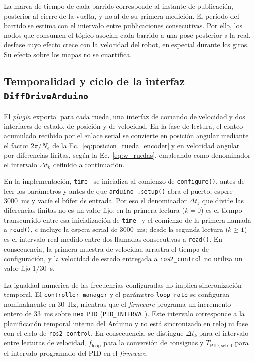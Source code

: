\begin{appendices}
La marca de tiempo de cada barrido corresponde al instante de publicación,
posterior al cierre de la vuelta, y no al de su primera medición. El período
del barrido se estima con el intervalo entre publicaciones consecutivas. Por
ello, los nodos que consumen el tópico asocian cada barrido a una pose
posterior a la real, desfase cuyo efecto crece con la velocidad del robot, en
especial durante los giros. Su efecto sobre los mapas no se cuantifica.

\subsection{Temporalidad y ciclo de la interfaz \texttt{DiffDriveArduino}}
\label{anx:implementacion_diffdrive}

\noindent El \textit{plugin} exporta, para cada rueda, una interfaz de comando de
velocidad y dos interfaces de estado, de posición y de velocidad. En la fase
de lectura, el conteo acumulado recibido por el enlace serial se convierte en
posición angular mediante el factor $2\pi/N_e$ de la
Ec.~\eqref{eq:posicion_rueda_encoder} y en velocidad angular por diferencias
finitas, según la Ec.~\eqref{eq:w_ruedas}, empleando como denominador el
intervalo $\Delta t_k$ definido a continuación.

\noindent En la implementación, \texttt{time\_} se inicializa al comienzo de \texttt{configure()}, antes de leer los parámetros y antes de que \texttt{arduino\_.setup()} abra el puerto, espere 3000~ms y vacíe el búfer de entrada. Por eso el denominador $\Delta t_k$ que divide las diferencias finitas no es un valor fijo: en la primera lectura ($k=0$) es el tiempo transcurrido entre esa inicialización de \texttt{time\_} y el comienzo de la primera llamada a \texttt{read()}, e incluye la espera serial de 3000~ms; desde la segunda lectura ($k\geq1$) es el intervalo real medido entre dos llamadas consecutivas a \texttt{read()}. En consecuencia, la primera muestra de velocidad arrastra el tiempo de configuración, y la velocidad de estado entregada a \texttt{ros2\_control} no utiliza un valor fijo $1/30$~s.

La igualdad numérica de las frecuencias configuradas no implica sincronización temporal. El \texttt{controller\_manager} y el parámetro \texttt{loop\_rate} se configuran nominalmente en 30~Hz, mientras que el \textit{firmware} programa un incremento entero de $33$~ms sobre \texttt{nextPID} (\texttt{PID\_INTERVAL}). Este intervalo corresponde a la
planificación temporal interna del Arduino y no está sincronizado en reloj ni fase con el ciclo de \texttt{ros2\_control}. En consecuencia, se distingue $\Delta t_k$ para el intervalo entre lecturas de velocidad, $f_{\mathrm{loop}}$ para la conversión de consignas y $T_{\mathrm{PID,sched}}$ para el intervalo programado del PID en el  \textit{firmware}.


\end{appendices}
